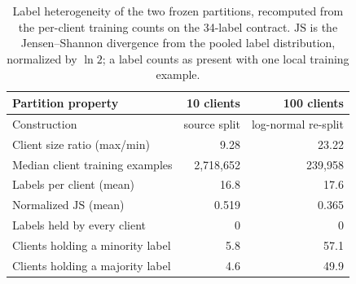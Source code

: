 \begin{table}[!tb]
\centering\small
\caption{Label heterogeneity of the two frozen partitions, recomputed from the per-client training counts on the 34-label contract. $\mathrm{JS}$ is the Jensen--Shannon divergence from the pooled label distribution, normalized by $\ln 2$; a label counts as present with one local training example.}
\label{tab:heterogeneity}
\setlength{\tabcolsep}{3pt}
\begin{tabular}{lrr}
\toprule
Partition property & 10 clients & 100 clients \\
\midrule
Construction & source split & log-normal re-split \\
Client size ratio (max/min) & 9.28 & 23.22 \\
Median client training examples & 2{,}718{,}652 & 239{,}958 \\
\midrule
Labels per client (mean) & 16.8 & 17.6 \\
Normalized $\mathrm{JS}$ (mean) & 0.519 & 0.365 \\
\midrule
Labels held by every client & 0 & 0 \\
Clients holding a minority label & 5.8 & 57.1 \\
Clients holding a majority label & 4.6 & 49.9 \\
\bottomrule
\end{tabular}
\end{table}
